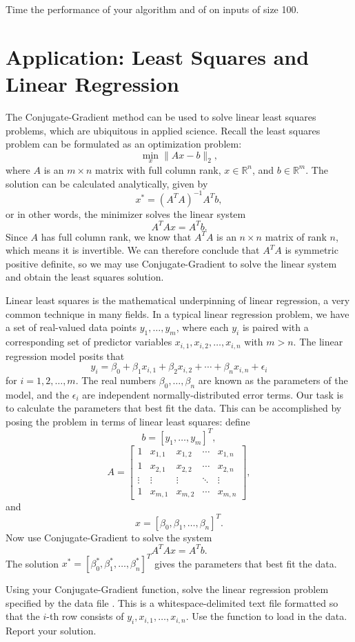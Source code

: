 Time the performance of your algorithm and of  on inputs of size 100.

\section*{Application: Least Squares and Linear Regression}
The Conjugate-Gradient method can be used to solve linear least squares problems, which are ubiquitous in applied science.
Recall the least squares problem can be formulated as an optimization problem:
$$
\min_x \|Ax - b\|_2,
$$ 
where $A$ is an $m \times n$ matrix with full column rank, $x \in \mathbb{R}^n$, and $b \in \mathbb{R}^m$. The solution can
be calculated analytically, given by
$$
x^* = (A^TA)^{-1}A^Tb,
$$
or in other words, the minimizer solves the linear system
$$
A^TAx = A^Tb.
$$
Since $A$ has full column rank, we know that $A^TA$ is an $n \times n$ matrix of rank $n$, which means it is invertible. We can 
therefore conclude that $A^TA$ is symmetric positive definite, so we may use Conjugate-Gradient to solve the linear system
and obtain the least squares solution.

Linear least squares is the mathematical underpinning of linear regression, a very common technique in many fields. 
In a typical linear regression problem, we have a set of real-valued data points $y_1,\ldots, y_m$, where each 
$y_i$ is paired with a corresponding set of predictor variables $x_{i,1}, x_{i,2}, \ldots, x_{i,n}$ with $m > n$.
The linear regression model posits that
$$
y_i = \beta_0 + \beta_1x_{i,1} + \beta_2x_{i,2} + \cdots + \beta_nx_{i,n} + \epsilon_i
$$
for $i = 1, 2, \ldots, m$. The real numbers $\beta_0,\ldots,\beta_n$ are known as the parameters of the model, and the
$\epsilon_i$ are independent normally-distributed error terms. Our task is to calculate the parameters that best fit the data.
This can be accomplished by posing the problem in terms of linear least squares: define
$$
b = [y_1, \ldots, y_m]^T,
$$
$$
A = 
\begin{bmatrix}
1 & x_{1,1} & x_{1,2} & \cdots & x_{1,n}\\
1 & x_{2,1} & x_{2,2} & \cdots & x_{2,n}\\
\vdots & \vdots & \vdots & \ddots & \vdots\\
1 & x_{m,1} & x_{m,2} & \cdots & x_{m,n}
\end{bmatrix},
$$
and
$$
x = [\beta_0, \beta_1,\ldots, \beta_n]^T.
$$
Now use Conjugate-Gradient to solve the system
$$
A^TAx = A^Tb.
$$
The solution $x^* = [\beta_0^*, \beta_1^*, \ldots, \beta_n^*]^T$ gives the parameters that best fit the data.
\begin{problem}
Using your Conjugate-Gradient function, solve the linear regression problem specified by the data file
. This is a whitespace-delimited text file formatted so that the $i$-th row consists of
$y_i, x_{i,1}, \ldots, x_{i,n}$. Use the function  to load in the data. Report your solution.
\end{problem}

